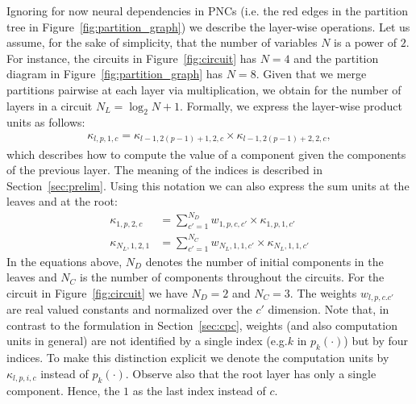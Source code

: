 \documentclass[letterpaper]{article} %
\newcommand{\eg}{e.g.\xspace}
\newcommand{\ie}{i.e.\xspace}
\newcommand{\circuit}{\ensuremath{p}}
\newcommand{\weight}{\ensuremath{w}}
\newcommand{\component}{\ensuremath{{\kappa}}}
\begin{document}
Ignoring for now neural dependencies in PNCs (\ie the red edges in the partition tree in Figure~\ref{fig:partition_graph}) we describe the layer-wise operations. Let us assume, for the sake of simplicity, that the number of variables $N$ is a power of $2$. For instance, the circuits in Figure~\ref{fig:circuit} has $N=4$ and the partition diagram in Figure~\ref{fig:partition_graph} has $N=8$. Given that we merge partitions pairwise at each layer via multiplication, we obtain for the number of layers in a circuit $N_L= \log_2 N+1$. Formally, we express the layer-wise product units as follows:
\begin{align}
    \component_{l,p,1,c} = \component_{l-1,2(p-1)+1,2,c} \times \component_{l-1,2(p-1)+2,2,c},
    \tag{ProductLayer}
\end{align}
which describes how to compute the value of a component given the components of the previous layer.
The meaning of the indices is described in Section~\ref{sec:prelim}. Using this notation we can also express the sum units at the leaves and at the root:
\begin{align}
    \component_{1,p,2,c}
     & =
    \sum_{c'=1}^{N_D} \weight_{1,p,c,c'} \times \component_{1,p,1,c'}
    \tag{SumLeaf}
    \\
    \component_{N_L,1,2,1}
     & =
    \sum_{c'=1}^{N_C} \weight_{N_L,1,1,c'} \times \component_{N_L,1,1,c'}
    \tag{SumRoot}
\end{align}
In the equations above, $N_D$ denotes the number of initial components in the leaves and $N_C$ is the number of components throughout the circuits.
For the circuit in Figure~\ref{fig:circuit} we have $N_D{=}2$ and $N_C{=}3$.
The weights $w_{l,p,c.c'}$ are real valued constants and normalized over the $c'$ dimension. Note that, in contrast to the formulation in Section~\ref{sec:cpc},
weights (and also computation units in general) are not identified by a single index (\eg $k$ in $\circuit_k(\cdot)$) but by four indices.
To make this distinction explicit we denote the computation units by $\kappa_{l,p,i,c}$ instead of $p_k(\cdot)$.
Observe also that the root layer has only a single component. Hence, the $1$ as the last index instead of $c$.
\end{document}
